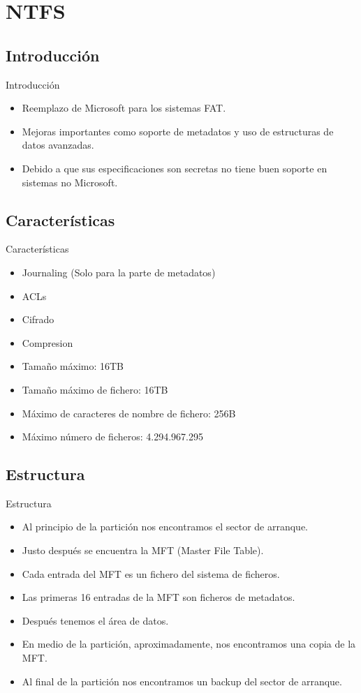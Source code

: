 \section{NTFS}
\subsection{Introducción}
\begin{frame}{Introducción}
  \begin{itemize}
    \item Reemplazo de Microsoft para los sistemas FAT.
    \item Mejoras importantes como soporte de metadatos y uso de estructuras de datos avanzadas.
    \item Debido a que sus especificaciones son secretas no tiene buen soporte en sistemas no Microsoft.
  \end{itemize}
\end{frame}

\subsection{Características}
\begin{frame}{Características}
  \begin{itemize}
    \item Journaling (Solo para la parte de metadatos)
    \item ACLs
    \item Cifrado
    \item Compresion
    \item Tamaño máximo: 16TB
    \item Tamaño máximo de fichero: 16TB
    \item Máximo de caracteres de nombre de fichero: 256B
    \item Máximo número de ficheros: 4.294.967.295
  \end{itemize}
\end{frame}

\subsection{Estructura}
\begin{frame}{Estructura}
  \begin{itemize}
    \item Al principio de la partición nos encontramos el sector de arranque.
    \item Justo después se encuentra la MFT (Master File Table).
    \item Cada entrada del MFT es un fichero del sistema de ficheros.
    \item Las primeras 16 entradas de la MFT son ficheros de metadatos.
    \item Después tenemos el área de datos.
    \item En medio de la partición, aproximadamente, nos encontramos una copia de la MFT.
    \item Al final de la partición nos encontramos un backup del sector de arranque.
  \end{itemize}
\end{frame}

